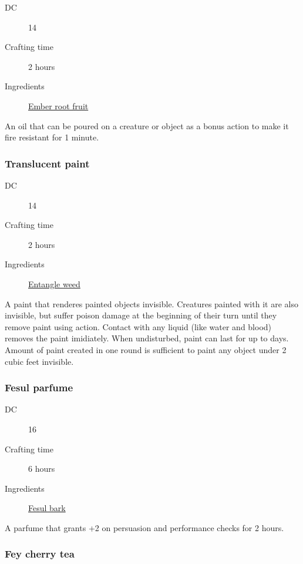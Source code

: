 \begin{description}
\item [DC] 14
\item [Crafting time] 2 hours
\item [Ingredients] \hyperref[Ember root]{Ember root fruit}
\end{description}

An oil that can be poured on a creature or object as a bonus action to make it fire resistant for 1 minute.

\subsubsection{Translucent paint}
\label{Translucent paint}

\begin{description}
\item [DC] 14
\item [Crafting time] 2 hours
\item [Ingredients] \hyperref[Entangle Weed]{Entangle weed}
\end{description}

A paint that renderes painted objects invisible. Creatures painted with it are also invisible, 
but suffer  poison damage at the beginning of their turn until they remove paint using action. 
Contact with any liquid (like water and blood) removes the paint imidiately. 
When undisturbed, paint can last for up to  days. 
Amount of paint created in one round is sufficient to paint any object under 2 cubic feet invisible.

\subsubsection{Fesul parfume}
\label{Fesul parfume}

\begin{description}
\item [DC] 16
\item [Crafting time] 6 hours
\item [Ingredients] \hyperref[Fesul]{Fesul bark}
\end{description}

A parfume that grants +2 on persuasion and performance checks for 2 hours.

\subsubsection{Fey cherry tea}
\label{Fey cherry tea}


